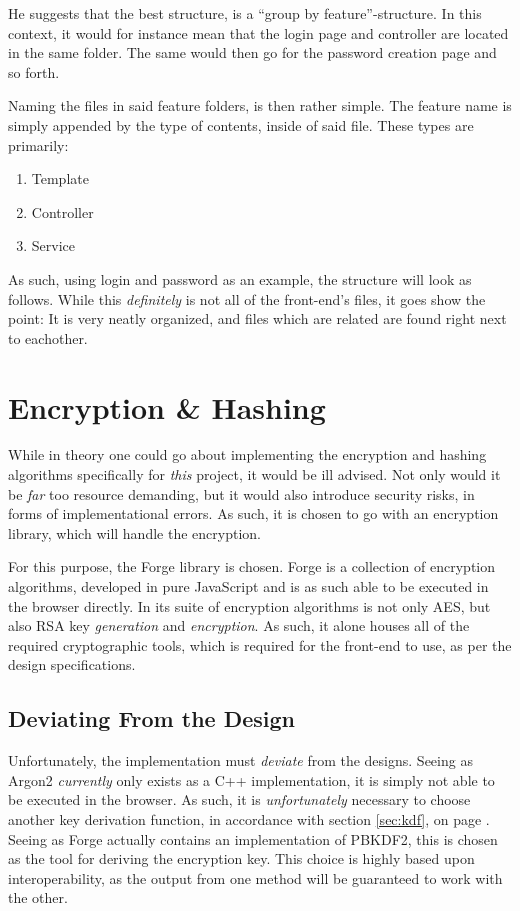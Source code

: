 		He suggests that the best structure, is a ``group by feature''-structure. In this context, it would for instance mean that the login page and controller are located in the same folder. The same would then go for the password creation page and so forth.

		Naming the files in said feature folders, is then rather simple. The feature name is simply appended by the type of contents, inside of said file. These types are primarily:
		\begin{enumerate}
			\item Template
			\item Controller
			\item Service
		\end{enumerate}
		As such, using login and password as an example, the structure will look as follows. While this \emph{definitely} is not all of the front-end's files, it goes show the point: It is very neatly organized, and files which are related are found right next to eachother.


	\section{Encryption \& Hashing}
		While in theory one could go about implementing the encryption and hashing algorithms specifically for \emph{this} project, it would be ill advised. Not only would it be \emph{far} too resource demanding, but it would also introduce security risks, in forms of implementational errors. As such, it is chosen to go with an encryption library, which will handle the encryption.

		For this purpose, the Forge library is chosen\cite{forge-encryption}. Forge is a collection of encryption algorithms, developed in pure JavaScript and is as such able to be executed in the browser directly. In its suite of encryption algorithms is not only AES, but also RSA key \emph{generation} and \emph{encryption}. As such, it alone houses all of the required cryptographic tools, which is required for the front-end to use, as per the design specifications.

		\subsection{Deviating From the Design}
			Unfortunately, the implementation must \emph{deviate} from the designs. Seeing as Argon2 \emph{currently} only exists as a C++ implementation, it is simply not able to be executed in the browser. As such, it is \emph{unfortunately} necessary to choose another key derivation function, in accordance with section \ref{sec:kdf}, on page \pageref{sec:kdf}. Seeing as Forge actually contains an implementation of PBKDF2, this is chosen as the tool for deriving the encryption key. This choice is highly based upon interoperability, as the output from one method will be guaranteed to work with the other.

